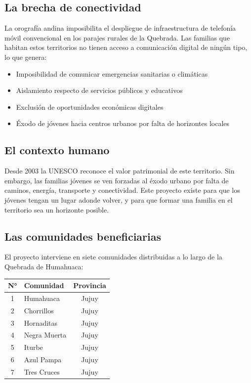 \documentclass[12pt,a4paper]{article}
\begin{document}
\subsection{La brecha de conectividad}

La orografía andina imposibilita el despliegue de infraestructura de telefonía móvil convencional en los parajes rurales de la Quebrada. Las familias que habitan estos territorios no tienen acceso a comunicación digital de ningún tipo, lo que genera:

\begin{itemize}
  \item Imposibilidad de comunicar emergencias sanitarias o climáticas
  \item Aislamiento respecto de servicios públicos y educativos
  \item Exclusión de oportunidades económicas digitales
  \item Éxodo de jóvenes hacia centros urbanos por falta de horizontes locales
\end{itemize}

\subsection{El contexto humano}

Desde 2003 la UNESCO reconoce el valor patrimonial de este territorio. Sin embargo, las familias jóvenes se ven forzadas al éxodo urbano por falta de caminos, energía, transporte y conectividad. Este proyecto existe para que los jóvenes tengan un lugar adonde volver, y para que formar una familia en el territorio sea un horizonte posible.

\subsection{Las comunidades beneficiarias}

El proyecto interviene en siete comunidades distribuidas a lo largo de la Quebrada de Humahuaca:

\begin{center}
\begin{tabular}{clc}
\toprule
\textbf{N°} & \textbf{Comunidad} & \textbf{Provincia} \\
\midrule
1 & Humahuaca       & Jujuy \\
2 & Chorrillos      & Jujuy \\
3 & Hornaditas      & Jujuy \\
4 & Negra Muerta    & Jujuy \\
5 & Iturbe          & Jujuy \\
6 & Azul Pampa      & Jujuy \\
7 & Tres Cruces     & Jujuy \\
\bottomrule
\end{tabular}
\end{center}
\end{document}
